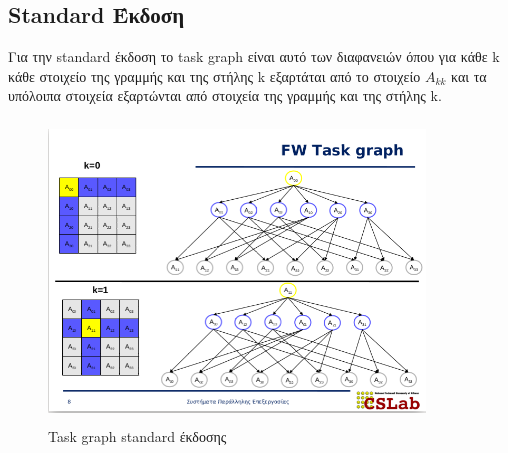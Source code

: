 \documentclass{article}
\newcommand\e[1]{\foreignlanguage{english}{#1}}
\begin{document}
\subsection{\e{Standard} Έκδοση}
Για την \e{standard} έκδοση το \e{task graph} είναι αυτό των διαφανειών όπου για κάθε \e{k} κάθε στοιχείο της γραμμής και της στήλης \e{k} εξαρτάται από το στοιχείο $A_{kk}$ και τα υπόλοιπα στοιχεία εξαρτώνται από στοιχεία της γραμμής και της στήλης \e{k}.\\
\begin{figure}[H]
  \centering
  \includegraphics[width=10cm, height=8cm]{../3_images/fw.png}
  \caption{\e{Task graph standard} έκδοσης}
\end{figure}

\newpage
\end{document}
